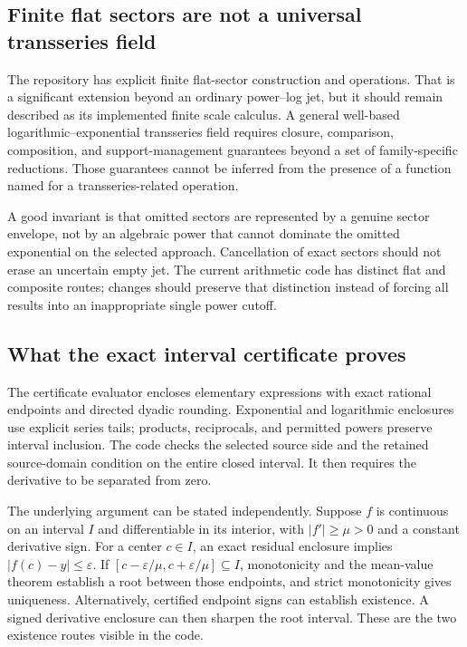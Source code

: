 \documentclass[11pt,a4paper]{article}
\begin{document}
\subsection{Finite flat sectors are not a universal transseries field}
The repository has explicit finite flat-sector construction and operations.
That is a significant extension beyond an ordinary power--log jet, but it
should remain described as its implemented finite scale calculus. A general
well-based logarithmic--exponential transseries field requires closure,
comparison, composition, and support-management guarantees beyond a set of
family-specific reductions. Those guarantees cannot be inferred from the
presence of a function named for a transseries-related operation.
\cite{readme,seriesarith}

A good invariant is that omitted sectors are represented by a genuine
sector envelope, not by an algebraic power that cannot dominate the omitted
exponential on the selected approach. Cancellation of exact sectors should
not erase an uncertain empty jet. The current arithmetic code has distinct
flat and composite routes; changes should preserve that distinction instead
of forcing all results into an inappropriate single power cutoff.

\subsection{What the exact interval certificate proves}
The certificate evaluator encloses elementary expressions with exact
rational endpoints and directed dyadic rounding. Exponential and logarithmic
enclosures use explicit series tails; products, reciprocals, and permitted
powers preserve interval inclusion. The code checks the selected source
side and the retained source-domain condition on the entire closed interval.
It then requires the derivative to be separated from zero.
\cite{certificates}

The underlying argument can be stated independently. Suppose $f$ is
continuous on an interval $I$ and differentiable in its interior, with
$|f'|\geq\mu>0$ and a constant derivative sign. For a center $c\in I$, an
exact residual enclosure implies $|f(c)-y|\leq\varepsilon$. If
$[c-\varepsilon/\mu,c+\varepsilon/\mu]\subseteq I$, monotonicity and the
mean-value theorem establish a root between those endpoints, and strict
monotonicity gives uniqueness. Alternatively, certified endpoint signs can
establish existence. A signed derivative enclosure can then sharpen the
root interval. These are the two existence routes visible in the code.
\end{document}
